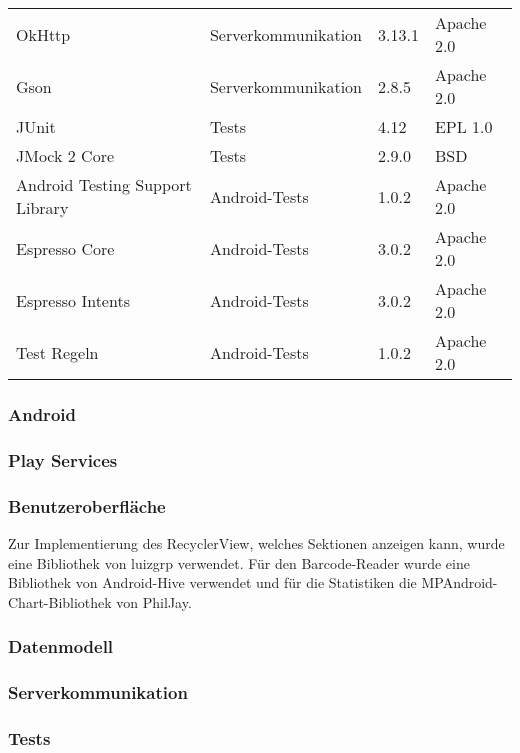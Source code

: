 \begin{tabularx}{\textwidth}{X|l|l|l}
    OkHttp & Serverkommunikation & 3.13.1 & Apache 2.0\\   %
    Gson & Serverkommunikation & 2.8.5 & Apache 2.0\\   %

    JUnit & Tests & 4.12 & EPL 1.0\\   %
    JMock 2 Core & Tests & 2.9.0 & BSD\\    %

    Android Testing Support Library & Android-Tests & 1.0.2 & Apache 2.0\\   %
    Espresso Core & Android-Tests & 3.0.2 & Apache 2.0\\    %
    Espresso Intents & Android-Tests & 3.0.2 & Apache 2.0\\ %
    Test Regeln & Android-Tests & 1.0.2 & Apache 2.0\\  %

\end{tabularx}

\subsubsection{Android}

\subsubsection{Play Services}

\subsubsection{Benutzeroberfläche}
Zur Implementierung des RecyclerView, welches Sektionen anzeigen kann, wurde eine Bibliothek von luizgrp verwendet.
Für den Barcode-Reader wurde eine Bibliothek von Android-Hive verwendet und für die Statistiken die MPAndroid-Chart-Bibliothek von PhilJay.

\subsubsection{Datenmodell}

\subsubsection{Serverkommunikation}

\subsubsection{Tests}
